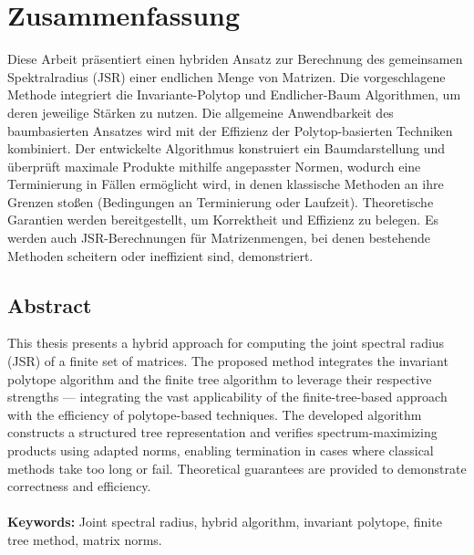 \chapter*{Zusammenfassung}

Diese Arbeit präsentiert einen hybriden Ansatz zur Berechnung des gemeinsamen Spektralradius (JSR) einer endlichen Menge von Matrizen. Die vorgeschlagene Methode integriert die Invariante-Polytop und Endlicher-Baum Algorithmen, um deren jeweilige Stärken zu nutzen. Die allgemeine Anwendbarkeit des baumbasierten Ansatzes wird mit der Effizienz der Polytop-basierten Techniken kombiniert. Der entwickelte Algorithmus konstruiert ein Baumdarstellung und überprüft maximale Produkte mithilfe angepasster Normen, wodurch eine Terminierung in Fällen ermöglicht wird, in denen klassische Methoden an ihre Grenzen stoßen (Bedingungen an Terminierung oder Laufzeit). Theoretische Garantien werden bereitgestellt, um Korrektheit und Effizienz zu belegen. Es werden auch JSR-Berechnungen für Matrizenmengen, bei denen bestehende Methoden scheitern oder ineffizient sind, demonstriert.

\vspace{1.3em} 					%
\section*{\huge Abstract} 	%
\vspace{1.3em} 					%

This thesis presents a hybrid approach for computing the joint spectral radius (JSR) of a finite set of matrices. The proposed method integrates the invariant polytope algorithm and the finite tree algorithm to leverage their respective strengths — integrating the vast applicability of the finite-tree-based approach with the efficiency of polytope-based techniques. The developed algorithm constructs a structured tree representation and verifies spectrum-maximizing products using adapted norms, enabling termination in cases where classical methods take too long or fail. Theoretical guarantees are provided to demonstrate correctness and efficiency. \\ \\
\textbf{Keywords:} Joint spectral radius, hybrid algorithm, invariant polytope, finite tree method, matrix norms.

